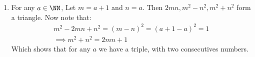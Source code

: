 \begin{enumerate}[label=]
   \item 
      For any $a \in \NN$, Let $m = a + 1$ and $n = a $. Then $2mn, m^2 - n^2, m^2 + n^2$ form a triangle.
      Now note that:
      \begin{gather*}
         m^2 - 2mn + n^2 = (m - n)^2 = (a + 1 - a)^2 = 1 \\
         \implies m^2 + n^2 = 2mn + 1
      \end{gather*}
      Which shows that for any $a$ we have a triple, with two consecutives numbers.
\end{enumerate}